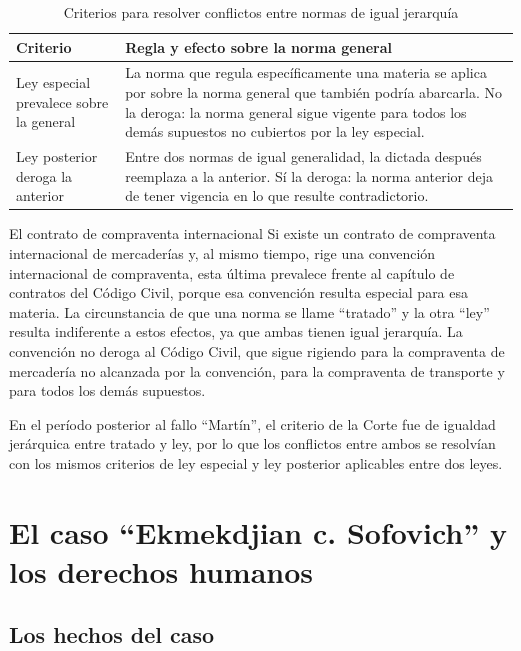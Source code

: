 \documentclass[12pt,oneside]{book}
\begin{document}
\begin{table}[H]
\centering
\caption{Criterios para resolver conflictos entre normas de igual jerarquía}
\begin{tabularx}{\textwidth}{@{}>{\raggedright\arraybackslash}p{}X@{}}
\toprule
\textbf{Criterio} & \textbf{Regla y efecto sobre la norma general} \\
\midrule
Ley especial prevalece sobre la general &
La norma que regula específicamente una materia se aplica por sobre la norma general que también podría abarcarla. No la deroga: la norma general sigue vigente para todos los demás supuestos no cubiertos por la ley especial. \\
\addlinespace
Ley posterior deroga la anterior &
Entre dos normas de igual generalidad, la dictada después reemplaza a la anterior. Sí la deroga: la norma anterior deja de tener vigencia en lo que resulte contradictorio. \\
\bottomrule
\end{tabularx}
\end{table}

\begin{example}{El contrato de compraventa internacional}
Si existe un contrato de compraventa internacional de mercaderías y, al mismo tiempo, rige una convención internacional de compraventa, esta última prevalece frente al capítulo de contratos del Código Civil, porque esa convención resulta especial para esa materia. La circunstancia de que una norma se llame ``tratado'' y la otra ``ley'' resulta indiferente a estos efectos, ya que ambas tienen igual jerarquía. La convención no deroga al Código Civil, que sigue rigiendo para la compraventa de mercadería no alcanzada por la convención, para la compraventa de transporte y para todos los demás supuestos.
\end{example}

En el período posterior al fallo ``Martín'', el criterio de la Corte fue de igualdad jerárquica entre tratado y ley, por lo que los conflictos entre ambos se resolvían con los mismos criterios de ley especial y ley posterior aplicables entre dos leyes.

\section{El caso ``Ekmekdjian c. Sofovich'' y los derechos humanos}

\subsection{Los hechos del caso}
\end{document}
